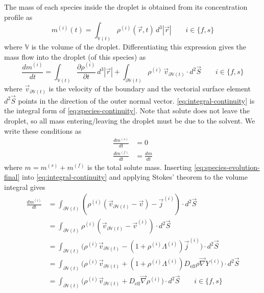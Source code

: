 \documentclass[11pt,twoside]{report}
\begin{document}
The mass of each species inside the droplet is obtained from its concentration profile as
\begin{equation}
  m^{(i)}(t) = \int_{\mathbb{V}(t)} \rho^{(i)}(\vec{r},t) \, d^3|\vec{r}|
  \qquad i \in \{f,s\}
\end{equation}
where $\mathbb{V}$ is the volume of the droplet.
Differentiating this expression gives the mass flow into the droplet (of this species) as
\begin{equation}\label{eq:integral-continuity}
  \frac{d m^{(i)}}{dt} =
  \int_{\mathbb{V}(t)} \frac{\partial \rho^{(i)}}{\partial t} \, d^3|\vec{r}| +
  \int_{\partial \mathbb{V}(t)} \rho^{(i)} \, \vec{v}_{\partial \mathbb{V}(t)} \cdot d^2\vec{S}
  \qquad i \in \{f,s\}
\end{equation}
where $\vec{v}_{\partial \mathbb{V}(t)}$ is the velocity of the boundary and the vectorial surface element $d^2\vec{S}$ points in the direction of the outer normal vector.
\eqref{eq:integral-continuity} is the integral form of \eqref{eq:species-continuity}.
Note that solute does not leave the droplet, so all mass entering/leaving the droplet must be due to the solvent.
We write these conditions as
\begin{subequations}
  \begin{align}
    \frac{d m^{(s)}}{dt} &= 0 \\
    \frac{d m^{(f)}}{dt} &= \frac{d m}{dt}
  \end{align}
\end{subequations}
where $m = m^{(s)} + m^{(f)}$ is the total solute mass.
Inserting \eqref{eq:species-evolution-final} into \eqref{eq:integral-continuity} and applying Stokes' theorem to the volume integral gives
\begin{equation}
  \begin{aligned}
    \frac{d m^{(i)}}{dt} &=
    \int_{\partial \mathbb{V}(t)}
    (\rho^{(i)} (\vec{v}_{\partial \mathbb{V}(t)} - \vec{v}) - \vec{j}^{(i)})
    \cdot d^2\vec{S} \\
    &=
    \int_{\partial \mathbb{V}(t)}
    \rho^{(i)} (\vec{v}_{\partial \mathbb{V}(t)} - \vec{v}^{(i)})
    \cdot d^2\vec{S} \\
    &=
    \int_{\partial \mathbb{V}(t)}
    \Big(
    \rho^{(i)} \vec{v}_{\partial \mathbb{V}(t)} -
    (1 + \rho^{(i)} \Lambda^{(i)}) \vec{j}^{(i)}
    \Big)
    \cdot d^2\vec{S} \\
    &=
    \int_{\partial \mathbb{V}(t)}
    \Big(
    \rho^{(i)} \vec{v}_{\partial \mathbb{V}(t)} +
    (1 + \rho^{(i)} \Lambda^{(i)})
    D_{\textrm{eff}} \rho \vec{\nabla} Y^{(i)}
    \Big)
    \cdot d^2\vec{S} \\
    &=
    \int_{\partial \mathbb{V}(t)}
    \Big(
    \rho^{(i)} \vec{v}_{\partial \mathbb{V}(t)} +
    D_{\textrm{eff}} \vec{\nabla} \rho^{(i)}
    \Big)
    \cdot d^2\vec{S}
    \qquad i \in \{f,s\}
  \end{aligned}
\end{equation}
\end{document}
